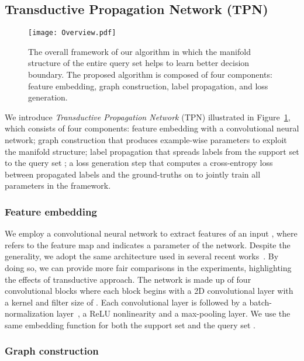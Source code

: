 \documentclass{article} \usepackage{iclr2019_conference,times}
\begin{document}
\subsection{Transductive Propagation Network (TPN)}

\begin{figure}[t]
  \centering
  \texttt{[image: Overview.pdf]}
  \small
  \caption{The overall framework of our algorithm in which the manifold structure of the entire query set helps to learn better decision boundary. The proposed algorithm is composed of four components: feature embedding, graph construction, label propagation, and loss generation.}
  \label{transduction}
\end{figure}

We introduce \textit{Transductive Propagation Network} (TPN) illustrated  
in Figure~\ref{transduction}, which consists of four components: 
feature embedding with a convolutional neural network; 
graph construction that produces example-wise parameters to exploit the manifold structure;
label propagation that spreads labels from the support set  to the query set ; a loss generation step that computes a cross-entropy loss between propagated labels and the ground-truths on  to jointly train all parameters in
the framework.





\subsubsection{Feature embedding}
\label{embedding}

We employ a convolutional neural network  to extract features of an input ,
where  refers to the feature map and  indicates a parameter
of the network. Despite the generality, we adopt the same architecture used in several recent works~\citep{prototypical,compare,matching}. By doing so, we can provide more fair comparisons in the experiments, highlighting the effects of transductive approach.
The network is made up of four convolutional blocks where each block begins with a 2D convolutional layer with a  kernel and filter size of . Each convolutional layer is followed by a batch-normalization layer~\citep{bn}, a ReLU nonlinearity and a  max-pooling layer. We use the same embedding function  for both the support set  and the query set .





\subsubsection{Graph construction}
\label{graph}
\end{document}

